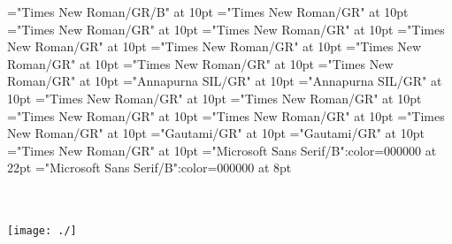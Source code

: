 \documentclass[a4paper]{article}
\begin{document}
\font\spanencomplexformformggoTeluINcomplexformrefsentryletData="Times New Roman/GR/B" at 10pt
\font\spanencomplexformrefsentryletData="Times New Roman/GR" at 10pt
\font\pictureRightentryletData="Times New Roman/GR" at 10pt
\font\picturepictureRightentryletData="Times New Roman/GR" at 10pt
\font\pictureCaptionpictureRightentryletData="Times New Roman/GR" at 10pt
\font\CmPicturepublishStemPileThumbnailPubpictureCaptionpictureRightentryletData="Times New Roman/GR" at 10pt
\font\spanenCmPicturepublishStemPileThumbnailPubpictureCaptionpictureRightentryletData="Times New Roman/GR" at 10pt
\font\pictureLabelenpictureCaptionpictureRightentryletData="Times New Roman/GR" at 10pt
\font\spanenpictureLabelenpictureCaptionpictureRightentryletData="Times New Roman/GR" at 10pt
\font\LexSensepublishStemGlossPubLehisensesensesentryletData="Annapurna SIL/GR" at 10pt
\font\spanhiLexSensepublishStemGlossPubLehisensesensesentryletData="Annapurna SIL/GR" at 10pt
\font\spanenLexSensepublishStemGlossPubLehisensesensesentryletData="Times New Roman/GR" at 10pt
\font\translationentranslationsexamplessensesensesentryletData="Times New Roman/GR" at 10pt
\font\xitementranslationentranslationsexamplessensesensesentryletData="Times New Roman/GR" at 10pt
\font\spanenxitementranslationentranslationsexamplessensesensesentryletData="Times New Roman/GR" at 10pt
\font\spanentranslationentranslationsexamplessensesensesentryletData="Times New Roman/GR" at 10pt
\font\xitemtetranslationentranslationsexamplessensesensesentryletData="Gautami/GR" at 10pt
\font\spantexitemtetranslationentranslationsexamplessensesensesentryletData="Gautami/GR" at 10pt
\font\spanenentryletData="Times New Roman/GR" at 10pt
\color{black} 
\thispagestyle{empty} 
\font\CoverPageTitle="Microsoft Sans Serif/B":color=000000 at 22pt 
\font\pFrontMatterdiv="Microsoft Sans Serif/B":color=000000 at 8pt 
\vskip 60pt 
\begin{center} 
\end{center} 
\newpage 
\newpage 
\thispagestyle{empty} 
\mbox{} 
\begin{titlepage}
\begin{center}
\textsc{\LARGE {}}\\[1.5cm] 
\vspace{110 mm} 
\textsc{ }\\[0.5cm] 
\texttt{[image: ./]}\\[1cm]    
\end{center} 
\end{titlepage} 
\setcounter{page}{3} 
 
\pagestyle{plain} 
\newpage 
\end{document}

